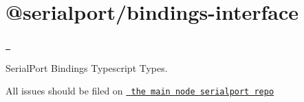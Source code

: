 \chapter{@serialport/bindings-\/interface}
\hypertarget{md_Dashboard_2node__modules_2_0dserialport_2bindings-interface_2README}{}\label{md_Dashboard_2node__modules_2_0dserialport_2bindings-interface_2README}
\label{md_Dashboard_2node__modules_2_0dserialport_2bindings-interface_2README_autotoc_md82}%
%
 \href{https://github.com/serialport/bindings-interface/actions/workflows/test.yml}{\texttt{ }}

Serial\+Port Bindings Typescript Types.

All issues should be filed on \href{github.com/serialport/node-serialport/}{\texttt{ the main node serialport repo}} 